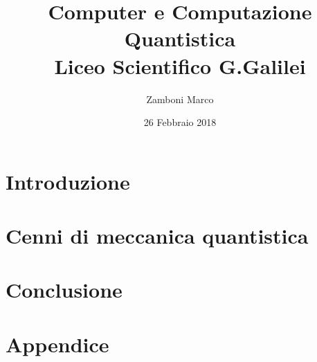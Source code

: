 \documentclass[10pt,a4paper]{report}
\author{Zamboni Marco}
\date{26 Febbraio 2018}
\title{{Computer e Computazione Quantistica}\\
		{\large Liceo Scientifico G.Galilei}}
\begin{document}
\maketitle
\tableofcontents
\chapter{Introduzione}

\chapter{Cenni di meccanica quantistica}

\chapter{Conclusione}

\appendix
\chapter{Appendice}

\end{document}
